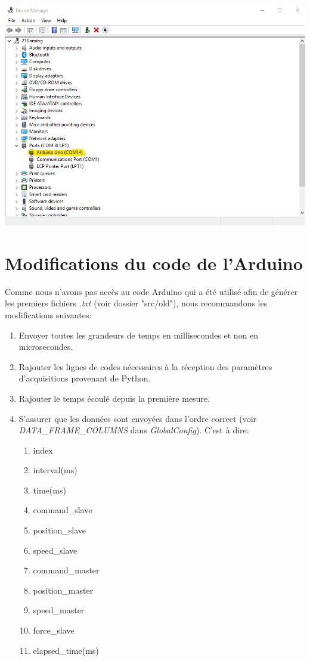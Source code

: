 \begin{center}
    \includegraphics[scale=0.45]{images/device_manager.png}
    \label{fig:port_com}
\end{center}

\newpage
\section{Modifications du code de l'Arduino}

Comme nous n'avons pas accès au code Arduino qui a été utilisé afin de générer les premiers fichiers \textit{.txt} (voir dossier "src/old"), nous recommandons les modifications suivantes:

\begin{enumerate}
    \item Envoyer toutes les grandeurs de temps en millisecondes et non en microsecondes.
    \item Rajouter les lignes de codes nécessaires à la réception des paramètres d'acquisitions provenant de Python.
    \item Rajouter le temps écoulé depuis la première mesure.
    \item S'assurer que les données sont envoyées dans l'ordre correct (voir \textit{DATA\_FRAME\_COLUMNS} dans \textit{GlobalConfig}). C'est à dire:
    \begin{enumerate}
        \item index
        \item interval(ms)
        \item time(ms)
        \item command\_slave
        \item position\_slave
        \item speed\_slave
        \item command\_master
        \item position\_master
        \item speed\_master
        \item force\_slave
        \item elapsed\_time(ms)
    \end{enumerate}
\end{enumerate}

